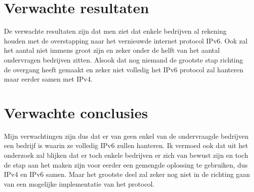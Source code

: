 \section{Verwachte resultaten}
\label{sec:verwachte_resultaten}

De verwachte resultaten zijn dat men ziet dat enkele bedrijven al rekening houden met de overstapping naar het vernieuwde internet protocol IPv6. Ook zal het aantal niet immens groot zijn en zeker onder de helft van het aantal ondervragen bedrijven zitten. Alsook dat nog niemand de grootste stap richting de overgang heeft gemaakt en zeker niet volledig het IPv6 protocol zal hanteren maar eerder samen met IPv4.

\section{Verwachte conclusies}
\label{sec:verwachte_conclusies}

Mijn verwachtingen zijn dus dat er van geen enkel van de ondervraagde bedrijven een bedrijf is waarin ze volledig IPv6 zullen hanteren. Ik vermoed ook dat uit het onderzoek zal blijken dat er toch enkele bedrijven er zich van bewust zijn en toch de stap aan het maken zijn voor eerder een gemengde oplossing te gebruiken, dus IPv4 en IPv6 samen. Maar het grootste deel zal zeker nog niet in de richting gaan van een mogelijke implementatie van het protocol.

